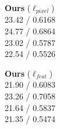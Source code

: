 \documentclass[runningheads]{llncs}
\begin{document}
\begin{figure}[t]
\begin{minipage}{0.22\textwidth}
    \centering \textbf{Ours} ($\ell_{pixel}$) \\ 23.42 / 0.6168 \\ 24.77 / 0.6864 \\ 23.02 / 0.5787
      \\ 22.54 / 0.5526 
  \end{minipage}
  \begin{minipage}{0.22\textwidth}
    \centering \textbf{Ours} ($\ell_{feat}$) \\  21.90 / 0.6083 \\ 23.26 / 0.7058 \\ 21.64 / 0.5837 
      \\ 21.35 / 0.5474
  \end{minipage} \\

\end{figure}
\end{document}
